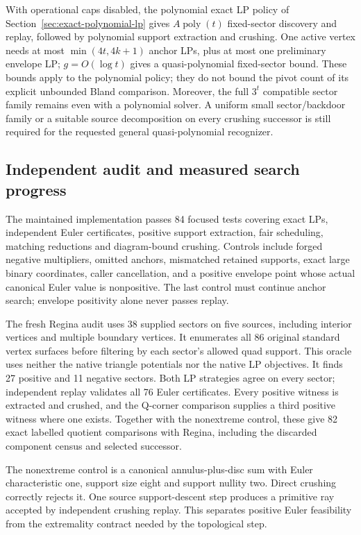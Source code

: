 With operational caps disabled, the polynomial exact LP policy of
Section~\ref{sec:exact-polynomial-lp} gives $A\operatorname{poly}(t)$
fixed-sector discovery and replay, followed by polynomial support extraction
and crushing.  One active vertex needs at most $\min(4t,4k+1)$ anchor LPs,
plus at most one preliminary envelope LP;
$g=O(\log t)$ gives a quasi-polynomial fixed-sector bound.  These bounds
apply to the polynomial policy; they do not bound the pivot count of its
explicit unbounded Bland comparison.
Moreover, the full $3^t$ compatible sector family remains even with a
polynomial solver.  A uniform small sector/backdoor family or a suitable
source decomposition on every crushing successor is still required for
the requested general quasi-polynomial recognizer.

\subsection{Independent audit and measured search progress}

The maintained implementation passes 84 focused tests covering exact LPs,
independent Euler certificates, positive support extraction, fair scheduling,
matching reductions and diagram-bound crushing.  Controls include forged
negative multipliers, omitted anchors, mismatched retained supports, exact
large binary coordinates, caller cancellation, and a positive envelope point
whose actual canonical Euler value is nonpositive.  The last control must
continue anchor search; envelope positivity alone never passes replay.

The fresh Regina audit uses 38 supplied sectors on five sources, including
interior vertices and multiple boundary vertices.  It enumerates all 86
original standard vertex surfaces before filtering by each sector's allowed
quad support.  This oracle uses neither the native triangle potentials nor
the native LP objectives.  It finds 27 positive and 11 negative sectors.
Both LP strategies agree on every sector; independent replay validates all
76 Euler certificates.  Every positive witness is extracted and crushed,
and the Q-corner comparison supplies a third positive witness where one
exists.  Together with the nonextreme control, these give 82 exact labelled
quotient comparisons with Regina, including the discarded component census
and selected successor.

The nonextreme control is a canonical annulus-plus-disc sum with Euler
characteristic one, support size eight and support nullity two.  Direct
crushing correctly rejects it.  One source support-descent step produces
a primitive ray accepted by independent crushing replay.  This separates
positive Euler feasibility from the extremality contract needed by the
topological step.

